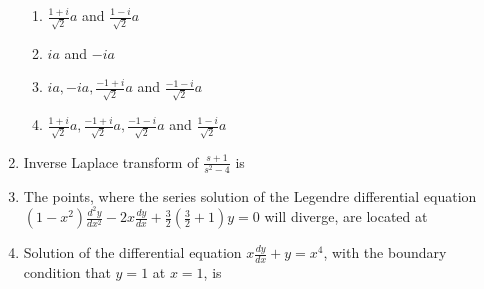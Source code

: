 \documentclass[journal,12pt,onecolumn]{IEEEtran}
\begin{document}
\begin{enumerate}[itemsep = 1em]
\hfill{}


\begin{enumerate}

\item $\frac{1+i}{\sqrt{2}}a$ and $\frac{1-i}{\sqrt{2}}a$
\item $ia$ and $-ia$
\item $ia, -ia, \frac{-1+i}{\sqrt{2}}a$ and $\frac{-1-i}{\sqrt{2}}a$
\item $\frac{1+i}{\sqrt{2}}a, \frac{-1+i}{\sqrt{2}}a, \frac{-1-i}{\sqrt{2}}a$ and $\frac{1-i}{\sqrt{2}}a$

\end{enumerate}

\vspace{2em}

\item Inverse Laplace transform of $\frac{s+1}{s^2-4}$ is

\hfill{}

\begin{enumerate}
\end{enumerate}

\item The points, where the series solution of the Legendre differential equation  
$(1-x^2)\frac{d^2y}{dx^2} - 2x\frac{dy}{dx} + \frac{3}{2}\left(\frac{3}{2}+1\right)y=0$  
will diverge, are located at

\hfill{}

\begin{enumerate}
\end{enumerate}

\vspace{3em}

\item Solution of the differential equation $x\frac{dy}{dx} + y = x^4$, with the boundary condition that $y=1$ at $x=1$, is


\end{enumerate}
\end{document}
